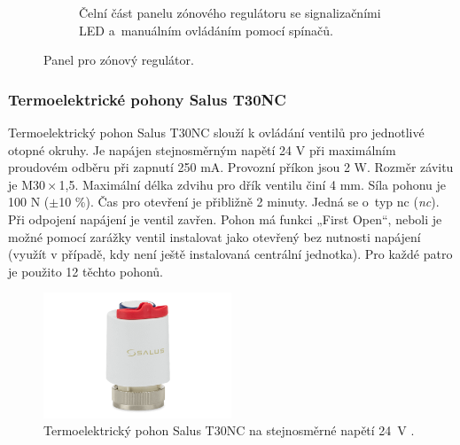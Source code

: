 \begin{figure}[H]
\begin{subfigure}{.5\textwidth}
  \caption[Čelní část panelu zónového regulátoru.]{Čelní část panelu zónového regulátoru se signalizačními LED a~manuálním ovládáním pomocí spínačů.}
    \label{fig:zonovy-regulator-vrchni-strana}
\end{subfigure}
\caption{Panel pro zónový regulátor.}
\label{fig:zonovy-regulator}
\end{figure}

\subsubsection{Termoelektrické pohony Salus T30NC}  
Termoelektrický pohon Salus T30NC slouží k ovládání ventilů pro jednotlivé otopné okruhy. Je napájen stejnosměrným napětí 24 V při maximálním proudovém odběru při zapnutí 250 mA. Provozní příkon jsou 2 W. Rozměr závitu je M30\,×\,1,5. Maximální délka zdvihu pro dřík ventilu činí 4 mm. Síla pohonu je 100 N ($\pm$10 \%). Čas pro otevření je přibližně 2 minuty. Jedná se o~typ \acrshort{nc} (\textit{\acrlong{nc}}). Při odpojení napájení je ventil zavřen. Pohon má funkci „First Open“, neboli je možné pomocí zarážky ventil instalovat jako otevřený bez nutnosti napájení (využít v případě, kdy není ještě instalovaná centrální jednotka). Pro každé patro je použito 12 těchto pohonů.

\begin{figure}[H]
    \centering
    \includegraphics[width=0.5\textwidth]{images/termoelektricky-pohon-salus-t30nc-24-v.png}
    \caption[Termoelektrický pohon Salus T30NC.]{Termoelektrický pohon Salus T30NC na stejnosměrné napětí 24~V \cite{termoelektricky-pohon-t30nc}.}
    \label{fig:termoelektricky-pohon-salus-t30nc-24-v}
\end{figure}